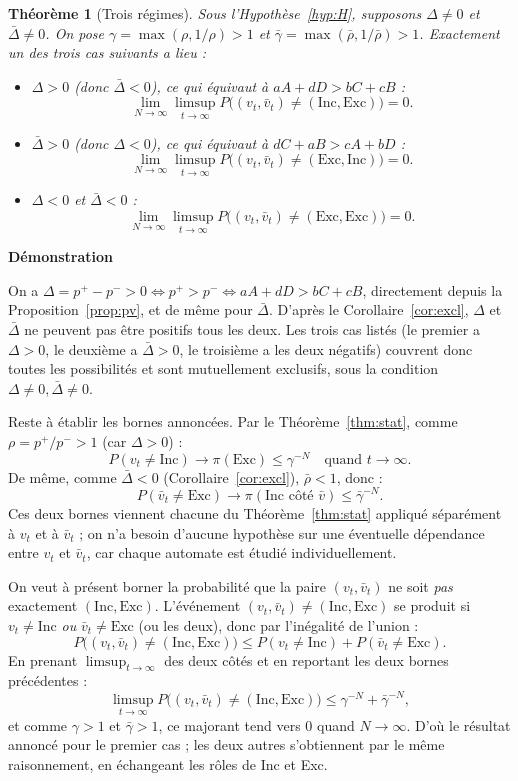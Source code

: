 \documentclass[11pt]{article}
\newtheorem{theorem}{Théorème}
\begin{document}
\begin{theorem}[Trois régimes]\label{thm:sel}
Sous l'Hypothèse~\ref{hyp:H}, supposons $\Delta \ne 0$ et $\bar\Delta \ne 0$. On pose $\gamma = \max(\rho, 1/\rho) > 1$ et $\bar\gamma = \max(\bar\rho, 1/\bar\rho) > 1$. Exactement un des trois cas suivants a lieu :
\begin{itemize}
\item $\Delta > 0$ (donc $\bar\Delta < 0$), ce qui équivaut à $aA+dD > bC+cB$ :
$$\lim_{N\to\infty} \limsup_{t\to\infty} P\big((v_t,\bar v_t) \ne (\text{Inc},\text{Exc})\big) = 0.$$
\item $\bar\Delta > 0$ (donc $\Delta < 0$), ce qui équivaut à $dC+aB > cA+bD$ :
$$\lim_{N\to\infty} \limsup_{t\to\infty} P\big((v_t,\bar v_t) \ne (\text{Exc},\text{Inc})\big) = 0.$$
\item $\Delta < 0$ et $\bar\Delta < 0$ :
$$\lim_{N\to\infty} \limsup_{t\to\infty} P\big((v_t,\bar v_t) \ne (\text{Exc},\text{Exc})\big) = 0.$$
\end{itemize}
\end{theorem}

\textbf{Démonstration}

On a $\Delta = p^+ - p^- > 0 \Leftrightarrow p^+ > p^- \Leftrightarrow aA+dD > bC+cB$, directement depuis la Proposition~\ref{prop:pv}, et de même pour $\bar\Delta$. D'après le Corollaire~\ref{cor:excl}, $\Delta$ et $\bar\Delta$ ne peuvent pas être positifs tous les deux. Les trois cas listés (le premier a $\Delta>0$, le deuxième a $\bar\Delta>0$, le troisième a les deux négatifs) couvrent donc toutes les possibilités et sont mutuellement exclusifs, sous la condition $\Delta \ne 0, \bar\Delta \ne 0$.

Reste à établir les bornes annoncées. Par le Théorème~\ref{thm:stat}, comme $\rho = p^+/p^- > 1$ (car $\Delta > 0$) :
$$P(v_t \ne \text{Inc}) \to \pi(\text{Exc}) \le \gamma^{-N} \quad \text{quand } t \to \infty.$$
De même, comme $\bar\Delta < 0$ (Corollaire~\ref{cor:excl}), $\bar\rho < 1$, donc :
$$P(\bar v_t \ne \text{Exc}) \to \pi(\text{Inc côté } \bar v) \le \bar\gamma^{-N}.$$
Ces deux bornes viennent chacune du Théorème~\ref{thm:stat} appliqué séparément à $v_t$ et à $\bar v_t$ ; on n'a besoin d'aucune hypothèse sur une éventuelle dépendance entre $v_t$ et $\bar v_t$, car chaque automate est étudié individuellement.

On veut à présent borner la probabilité que la paire $(v_t, \bar v_t)$ ne soit \emph{pas} exactement $(\text{Inc}, \text{Exc})$. L'événement $(v_t,\bar v_t) \ne (\text{Inc},\text{Exc})$ se produit si $v_t \ne \text{Inc}$ \emph{ou} $\bar v_t \ne \text{Exc}$ (ou les deux), donc par l'inégalité de l'union :
$$P\big((v_t,\bar v_t)\ne(\text{Inc},\text{Exc})\big) \le P(v_t \ne \text{Inc}) + P(\bar v_t \ne \text{Exc}).$$
En prenant $\limsup_{t\to\infty}$ des deux côtés et en reportant les deux bornes précédentes :
$$\limsup_{t\to\infty} P\big((v_t,\bar v_t)\ne(\text{Inc},\text{Exc})\big) \le \gamma^{-N} + \bar\gamma^{-N},$$
et comme $\gamma > 1$ et $\bar\gamma > 1$, ce majorant tend vers $0$ quand $N \to \infty$. D'où le résultat annoncé pour le premier cas ; les deux autres s'obtiennent par le même raisonnement, en échangeant les rôles de Inc et Exc.
\end{document}
